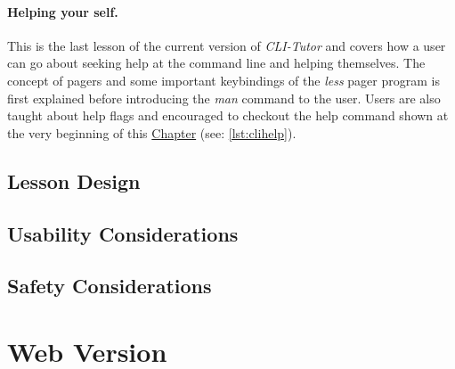 \paragraph{Helping your self.} This is the last lesson of the current version
of \textit{CLI-Tutor} and covers how a user can go about seeking help at the
command line and helping themselves. The concept of pagers and some important
keybindings of the \textit{less} pager program is first explained before
introducing the \textit{man} command to the user. Users are also taught about help flags and encouraged to checkout the help command shown at the very beginning of this \hyperref[chap:clitutor]{Chapter} (see: \autoref{lst:clihelp}).

\subsection{Lesson Design}
\subsection{Usability Considerations}
\subsection{Safety Considerations}
\section{Web Version}


